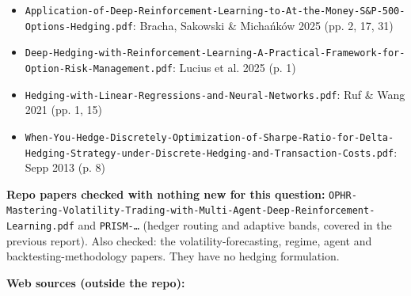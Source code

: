 \documentclass{article}
\begin{document}
\begin{itemize}
\item \texttt{Application-\allowbreak{}of-\allowbreak{}Deep-\allowbreak{}Reinforcement-\allowbreak{}Learning-\allowbreak{}to-\allowbreak{}At-\allowbreak{}the-\allowbreak{}Money-\allowbreak{}S\&P-\allowbreak{}500-\allowbreak{}Options-\allowbreak{}Hedging.\allowbreak{}pdf}: Bracha, Sakowski \& Michańków 2025 (pp. 2, 17, 31)

\item \texttt{Deep-\allowbreak{}Hedging-\allowbreak{}with-\allowbreak{}Reinforcement-\allowbreak{}Learning-\allowbreak{}A-\allowbreak{}Practical-\allowbreak{}Framework-\allowbreak{}for-\allowbreak{}Option-\allowbreak{}Risk-\allowbreak{}Management.\allowbreak{}pdf}: Lucius et al. 2025 (p. 1)

\item \texttt{Hedging-\allowbreak{}with-\allowbreak{}Linear-\allowbreak{}Regressions-\allowbreak{}and-\allowbreak{}Neural-\allowbreak{}Networks.\allowbreak{}pdf}: Ruf \& Wang 2021 (pp. 1, 15)

\item \texttt{When-\allowbreak{}You-\allowbreak{}Hedge-\allowbreak{}Discretely-\allowbreak{}Optimization-\allowbreak{}of-\allowbreak{}Sharpe-\allowbreak{}Ratio-\allowbreak{}for-\allowbreak{}Delta-\allowbreak{}Hedging-\allowbreak{}Strategy-\allowbreak{}under-\allowbreak{}Discrete-\allowbreak{}Hedging-\allowbreak{}and-\allowbreak{}Transaction-\allowbreak{}Costs.\allowbreak{}pdf}: Sepp 2013 (p. 8)

\end{itemize}

\textbf{Repo papers checked with nothing new for this question:} \texttt{OPHR-\allowbreak{}Mastering-\allowbreak{}Volatility-\allowbreak{}Trading-\allowbreak{}with-\allowbreak{}Multi-\allowbreak{}Agent-\allowbreak{}Deep-\allowbreak{}Reinforcement-\allowbreak{}Learning.\allowbreak{}pdf} and \texttt{PRISM-\allowbreak{}\ldots{}} (hedger routing and adaptive bands, covered in the previous report). Also checked: the volatility-forecasting, regime, agent and backtesting-methodology papers. They have no hedging formulation.

\textbf{Web sources (outside the repo):}
\end{document}
